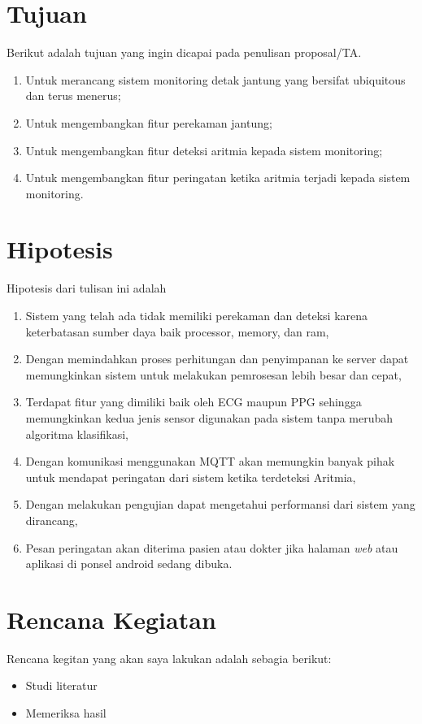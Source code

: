 \section{Tujuan}
Berikut adalah tujuan yang ingin dicapai pada penulisan proposal/TA.
\begin{enumerate}
    \item Untuk merancang sistem monitoring detak jantung yang bersifat ubiquitous dan terus menerus;
    \item Untuk mengembangkan fitur perekaman jantung;
    \item Untuk mengembangkan fitur deteksi aritmia kepada sistem monitoring;
    \item Untuk mengembangkan fitur peringatan ketika aritmia terjadi kepada sistem monitoring.
\end{enumerate}
\section{Hipotesis}
Hipotesis dari tulisan ini adalah
\begin{enumerate}
    \item Sistem yang telah ada tidak memiliki perekaman dan deteksi karena keterbatasan sumber daya baik processor, memory, dan ram,
    \item Dengan memindahkan proses perhitungan dan penyimpanan ke server dapat memungkinkan sistem untuk melakukan pemrosesan lebih besar dan cepat,
    \item Terdapat fitur yang dimiliki baik oleh ECG maupun PPG sehingga memungkinkan kedua jenis sensor digunakan pada sistem tanpa merubah algoritma klasifikasi,
    \item Dengan komunikasi menggunakan MQTT akan memungkin banyak pihak untuk mendapat peringatan dari sistem ketika terdeteksi Aritmia,
	\item Dengan melakukan pengujian dapat mengetahui performansi dari sistem yang dirancang,
	\item Pesan peringatan akan diterima pasien atau dokter jika halaman \textit{web} atau aplikasi di ponsel android sedang dibuka.
\end{enumerate}
\iflogTA
\else
\section{Rencana Kegiatan}
Rencana kegitan yang akan saya lakukan adalah sebagia berikut:
\begin{itemize}
    \item Studi literatur
    \item Memeriksa hasil
\end{itemize}
